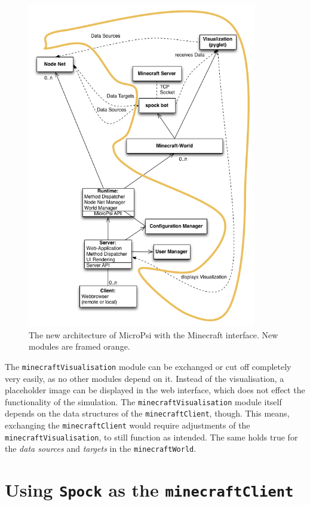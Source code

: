 \begin{figure}[h]
  \centering
    \includegraphics[width=10cm]{graphics/UML_MicroPsi_mit_spock_und_rahmen}
  \caption{The new architecture of MicroPsi with the Minecraft interface. New modules are framed orange.}
  \label{uml_mc}
\end{figure}

The \texttt{minecraftVisualisation} module can be exchanged or cut off completely very easily, as no other modules depend on it. Instead of the visualisation, a placeholder image can be displayed in the web interface, which does not effect the functionality of the simulation. The \texttt{minecraftVisualisation} module itself depends on the data structures of the \texttt{minecraftClient}, though. This means, exchanging the \texttt{minecraftClient} would require adjustments of the \texttt{minecraftVisualisation}, to still function as intended. The same holds true for the \emph{data sources} and \emph{targets} in the \texttt{minecraftWorld}.

    \section{Using \texttt{Spock} as the \texttt{minecraftClient}}


